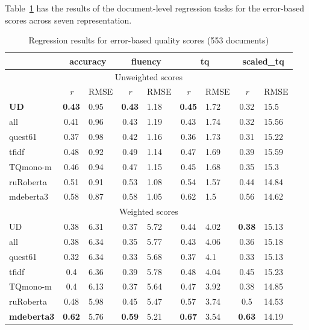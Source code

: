 Table~\ref{tab:doc_err_double} has the results of the document-level regression tasks for the error-based scores across seven representation.

\begin{table}[H]
	\centering
	\begin{tabular}{l|cl|cl|cl|cl}
		\toprule
		& \multicolumn{2}{c|}{accuracy} & \multicolumn{2}{c|}{fluency}  & \multicolumn{2}{c|}{\textbf{tq}} & \multicolumn{2}{c|}{scaled\_tq}    \\
		\midrule
		\multicolumn{9}{c}{Unweighted scores} \\
		\midrule
		       & \textit{r}  & RMSE & \textit{r}  & RMSE & \textit{r}  & RMSE & \textit{r} & RMSE  \\
		\midrule
			\textbf{UD}     & \textbf{0.43} & 0.95 & \textbf{0.43} & 1.18 & \textbf{0.45} & 1.72 & 0.32 & 15.5  \\
			all             & 0.41 & 0.96 & 0.43 & 1.19 & 0.43 & 1.74 & 0.32 & 15.56 \\
			quest61         & 0.37 & 0.98 & 0.42 & 1.16 & 0.36 & 1.73 & 0.31 & 15.22 \\
			\midrule
			tfidf           & 0.48 & 0.92 & 0.49 & 1.14 & 0.47 & 1.69 & 0.39 & 15.59 \\
			\midrule
			TQmono-m        & 0.46 & 0.94 & 0.47 & 1.15 & 0.45 & 1.68 & 0.35 & 15.3  \\
			ruRoberta & 0.51 & 0.91 & 0.53 & 1.08 & 0.54 & 1.57 & 0.44 & 14.84 \\
			mdeberta3  & 0.58 & 0.87 & 0.58 & 1.05 & 0.62 & 1.5  & 0.56 & 14.62 \\
		\midrule
		\midrule
		\multicolumn{9}{c}{Weighted scores} \\
		\midrule
		UD              & 0.38 & 6.31 & 0.37 & 5.72 & 0.44 & 4.02 & \textbf{0.38} & 15.13 \\
		all             & 0.38 & 6.34 & 0.35 & 5.77 & 0.43 & 4.06 & 0.36 & 15.18 \\
		quest61         & 0.32 & 6.34 & 0.33 & 5.68 & 0.37 & 4.1  & 0.33 & 15.13 \\
		\midrule
		tfidf           & 0.4  & 6.36 & 0.39 & 5.78 & 0.48 & 4.04 & 0.45 & 15.23 \\
		\midrule
		TQmono-m        & 0.4  & 6.13 & 0.37 & 5.64 & 0.47 & 3.92 & 0.38 & 14.85 \\
		ruRoberta & 0.48 & 5.98 & 0.45 & 5.47 & 0.57 & 3.74 & 0.5  & 14.53 \\
		\textbf{mdeberta3}  & \textbf{0.62} & 5.76 & \textbf{0.59} & 5.21 & \boxit{0.4in}\textbf{0.67} & 3.54 & \textbf{0.63} & 14.19 \\
		\bottomrule
	\end{tabular}
\caption{\label{tab:doc_err_double}Regression results for error-based quality scores (553 documents)}
\end{table}

